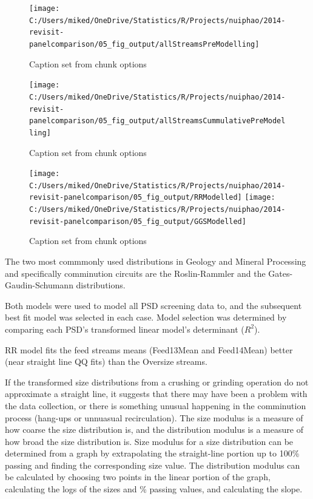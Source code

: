 \documentclass[
]{article}
\begin{document}
\begin{figure}

{\centering \texttt{[image: C:/Users/miked/OneDrive/Statistics/R/Projects/nuiphao/2014-revisit-panelcomparison/05\_fig\_output/allStreamsPreModelling]} 

}

\caption{Caption set from chunk options}\label{fig:unnamed-chunk-12}
\end{figure}

\begin{figure}

{\centering \texttt{[image: C:/Users/miked/OneDrive/Statistics/R/Projects/nuiphao/2014-revisit-panelcomparison/05\_fig\_output/allStreamsCummulativePreModelling]} 

}

\caption{Caption set from chunk options}\label{fig:unnamed-chunk-13}
\end{figure}

\begin{figure}

{\centering \texttt{[image: C:/Users/miked/OneDrive/Statistics/R/Projects/nuiphao/2014-revisit-panelcomparison/05\_fig\_output/RRModelled]} \texttt{[image: C:/Users/miked/OneDrive/Statistics/R/Projects/nuiphao/2014-revisit-panelcomparison/05\_fig\_output/GGSModelled]} 

}

\caption{Caption set from chunk options}\label{fig:unnamed-chunk-14}
\end{figure}

The two most commmonly used distributions in Geology and Mineral
Processing and specifically comminution circuits are the Roslin-Rammler
and the Gates-Gaudin-Schumann distributions.

Both models were used to model all PSD screening data to, and the
subsequent best fit model was selected in each case. Model selection was
determined by comparing each PSD's transformed linear model's
determinant (\(R^2\)).

RR model fits the feed streams means (Feed13Mean and Feed14Mean) better
(near straight line QQ fits) than the Oversize streams.

If the transformed size distributions from a crushing or grinding
operation do not approximate a straight line, it suggests that there may
have been a problem with the data collection, or there is something
unusual happening in the comminution process (hang-ups or unnuasual
recirculation). The size modulus is a measure of how coarse the size
distribution is, and the distribution modulus is a measure of how broad
the size distribution is. Size modulus for a size distribution can be
determined from a graph by extrapolating the straight-line portion up to
100\% passing and finding the corresponding size value. The distribution
modulus can be calculated by choosing two points in the linear portion
of the graph, calculating the logs of the sizes and \% passing values,
and calculating the slope.
\end{document}
